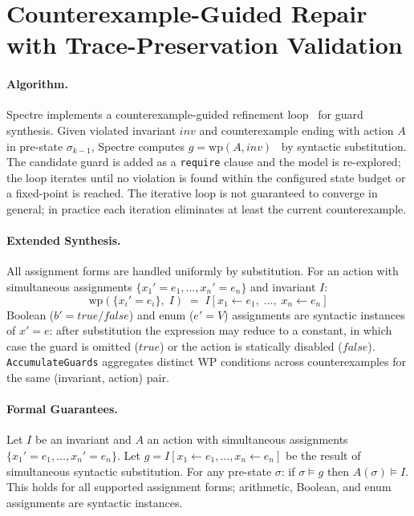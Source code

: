 \documentclass[runningheads]{llncs}
\begin{document}
\section{Counterexample-Guided Repair with Trace-Preservation Validation}\label{sec:cegis}

\paragraph{Algorithm.}
Spectre implements a counterexample-guided refinement loop~\cite{solar2008program,alur2013syntax}
for guard synthesis.  Given violated invariant $\mathit{inv}$ and counterexample
ending with action $A$ in pre-state $\sigma_{k-1}$, Spectre computes
$g = \mathrm{wp}(A, \mathit{inv})$~\cite{dijkstra1976discipline}
by syntactic substitution.  The candidate guard is added as a \texttt{require}
clause and the model is re-explored; the loop iterates until no violation is
found within the configured state budget or a fixed-point is reached.
The iterative loop is not guaranteed to converge in general; in practice each
iteration eliminates at least the current counterexample.

\paragraph{Extended Synthesis.}
All assignment forms are handled uniformly by substitution.
For an action with simultaneous assignments $\{x_1' = e_1, \ldots, x_n' = e_n\}$
and invariant $I$:
\[
\mathrm{wp}(\{x_i' = e_i\},\; I)
  \;=\; I[x_1 \leftarrow e_1,\;\ldots,\; x_n \leftarrow e_n]
\]
Boolean ($b' = \mathit{true/false}$) and enum ($e' = V$) assignments are
syntactic instances of $x' = e$: after substitution the expression may reduce
to a constant, in which case the guard is omitted ($\mathit{true}$) or the
action is statically disabled ($\mathit{false}$).
\texttt{AccumulateGuards} aggregates distinct WP conditions across counterexamples
for the same (invariant, action) pair.

\paragraph{Formal Guarantees.}

\begin{proposition}\label{prop:wp}
Let $I$ be an invariant and $A$ an action with simultaneous assignments
$\{x_1' = e_1, \ldots, x_n' = e_n\}$.  Let
$g = I[x_1 \leftarrow e_1, \ldots, x_n \leftarrow e_n]$
be the result of simultaneous syntactic substitution.
For any pre-state $\sigma$: if $\sigma \models g$ then $A(\sigma) \models I$.
This holds for all supported assignment forms; arithmetic, Boolean, and enum
assignments are syntactic instances.
\end{proposition}
\end{document}
